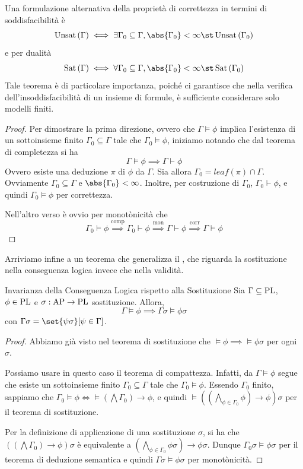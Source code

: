 Una formulazione alternativa della proprietà di correttezza in termini di soddisfacibilità è
\[\Unsat[\Gamma] \iff \exists \Gamma_0 \subseteq \Gamma, \abs{\Gamma_0} < \infty\st \Unsat[\Gamma_0]\]
e per dualità
\[\Sat[\Gamma] \iff \forall \Gamma_0 \subseteq \Gamma, \abs{\Gamma_0} < \infty \st \Sat[\Gamma_0]\]
Tale teorema è di particolare importanza, poiché ci garantisce che nella verifica dell'insoddisfacibilità di un insieme di formule, è sufficiente considerare solo modelli finiti.

\begin{proof}
  Per dimostrare la prima direzione, ovvero che \(\Gamma\models\phi\) implica l'esistenza di un sottoinsieme finito \(\Gamma_0\subseteq\Gamma\) tale che \(\Gamma_0\models\phi\), iniziamo notando che dal teorema di completezza si ha
  \[\Gamma \models \phi \implies \Gamma \vdash \phi\]
  Ovvero esiste una deduzione \(\pi\) di \(\phi\) da \(\Gamma\).
  Sia allora \(\Gamma_0 = leaf(\pi)\cap \Gamma\). Ovviamente \(\Gamma_0\subseteq\Gamma\) e \(\abs{\Gamma_0}<\infty\).
  Inoltre, per costruzione di \(\Gamma_0\), \(\Gamma_0\vdash\phi\), e quindi \(\Gamma_0\models\phi\) per correttezza.

  Nell'altro verso è ovvio per monotònicità che
  \[\Gamma_0\models\phi\overset{\text{comp}}{\implies}\Gamma_0\vdash\phi\overset{\text{mon}}{\implies}\Gamma\vdash\phi\overset{\text{corr}}{\implies}\Gamma\models\phi\]
\end{proof}

Arriviamo infine a un teorema che generalizza il , che riguarda la sostituzione nella conseguenza logica invece che nella validità.

\begin{theorem}{Invarianza della Conseguenza Logica rispetto alla Sostituzione}
  Sia \(\Gamma \subseteq \operatorname{PL}\), \(\phi \in \operatorname{PL}\) e \(\sigma:\AP \to \PL\) sostituzione. Allora,
  \[\Gamma\models\phi\implies\Gamma\sigma\models\phi\sigma\]
  con \(\Gamma\sigma = \set{\psi\sigma}[\psi\in\Gamma]\).
\end{theorem}

\begin{proof}
  Abbiamo già visto nel teorema di sostituzione che \(\models\phi \implies \models\phi\sigma\) per ogni \(\sigma\).

  Possiamo usare in questo caso il teorema di compattezza. Infatti, da \(\Gamma\models\phi\) segue che esiste un sottoinsieme finito \(\Gamma_0 \subseteq \Gamma\) tale che \(\Gamma_0\models\phi\).
  Essendo \(\Gamma_0\) finito, sappiamo che \(\Gamma_0\models\phi\iff\models(\bigwedge\Gamma_0)\to\phi\), e quindi \(\models((\bigwedge_{\phi\in\Gamma_0}\phi)\to\phi)\sigma\) per il teorema di sostituzione.

  Per la definizione di applicazione di una sostituzione \(\sigma\), si ha che \(((\bigwedge\Gamma_0)\to\phi)\sigma\) è equivalente a \((\bigwedge_{\phi\in\Gamma_0}\phi\sigma)\to\phi\sigma\).
  Dunque \(\Gamma_0\sigma\models\phi\sigma\) per il teorema di deduzione semantica e quindi \(\Gamma\sigma\models\phi\sigma\) per monotònicità.
\end{proof}

